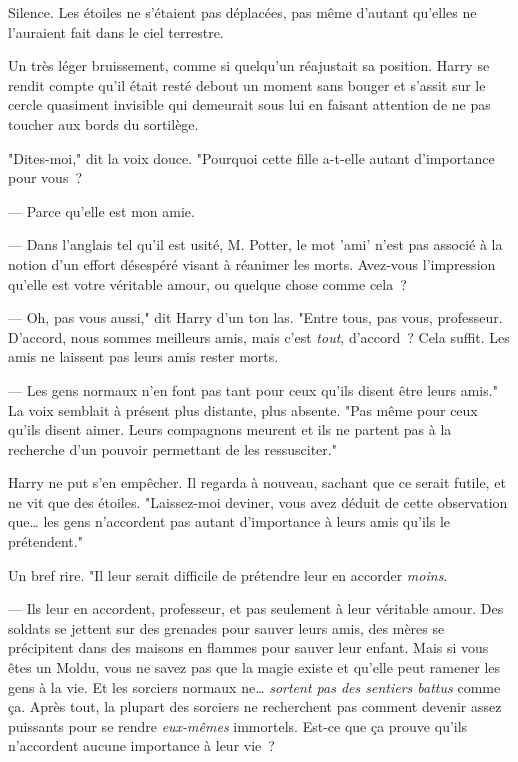 Silence. Les étoiles ne s'étaient pas déplacées, pas même d'autant qu'elles ne l'auraient fait dans le ciel terrestre.

Un très léger bruissement, comme si quelqu'un réajustait sa position. Harry se rendit compte qu'il était resté debout un moment sans bouger et s'assit sur le cercle quasiment invisible qui demeurait sous lui en faisant attention de ne pas toucher aux bords du sortilège.

"Dites-moi," dit la voix douce. "Pourquoi cette fille a-t-elle autant d'importance pour vous~?

--- Parce qu'elle est mon amie.

--- Dans l'anglais tel qu'il est usité, M. Potter, le mot 'ami' n'est pas associé à la notion d'un effort désespéré visant à réanimer les morts. Avez-vous l'impression qu'elle est votre véritable amour, ou quelque chose comme cela~?

--- Oh, pas vous aussi," dit Harry d'un ton las. "Entre tous, pas vous, professeur. D'accord, nous sommes meilleurs amis, mais c'est \emph{tout}, d'accord~? Cela suffit. Les amis ne laissent pas leurs amis rester morts.

--- Les gens normaux n'en font pas tant pour ceux qu'ils disent être leurs amis." La voix semblait à présent plus distante, plus absente. "Pas même pour ceux qu'ils disent aimer. Leurs compagnons meurent et ils ne partent pas à la recherche d'un pouvoir permettant de les ressusciter."

Harry ne put s'en empêcher. Il regarda à nouveau, sachant que ce serait futile, et ne vit que des étoiles. "Laissez-moi deviner, vous avez déduit de cette observation que… les gens n'accordent pas autant d'importance à leurs amis qu'ils le prétendent."

Un bref rire. "Il leur serait difficile de prétendre leur en accorder \emph{moins}.

--- Ils leur en accordent, professeur, et pas seulement à leur véritable amour. Des soldats se jettent sur des grenades pour sauver leurs amis, des mères se précipitent dans des maisons en flammes pour sauver leur enfant. Mais si vous êtes un Moldu, vous ne savez pas que la magie existe et qu'elle peut ramener les gens à la vie. Et les sorciers normaux ne… \emph{sortent pas des sentiers battus} comme ça. Après tout, la plupart des sorciers ne recherchent pas comment devenir assez puissants pour se rendre \emph{eux-mêmes} immortels. Est-ce que ça prouve qu'ils n'accordent aucune importance à leur vie~?

